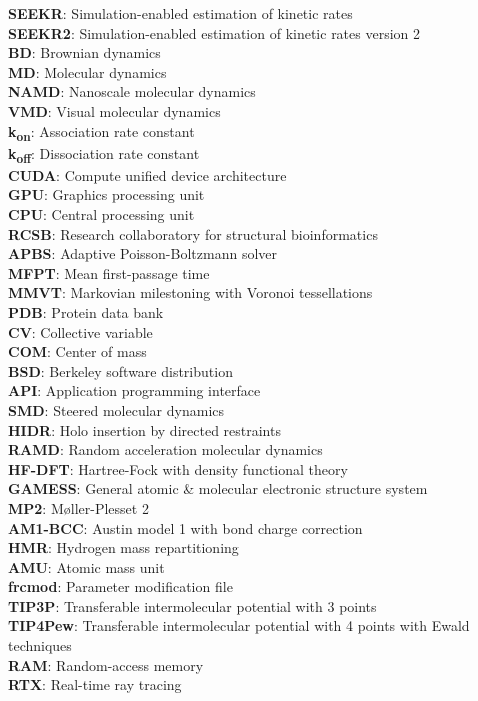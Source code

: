 \documentclass[9pt,training,pubversion]{livecoms}
\begin{document}
\begin{tcolorbox}[colback=black!10!white, colframe=black!50!black, fontlower=\tiny, left=2pt, right=2pt, top=2pt, bottom=2pt]
\small{\textbf{SEEKR}: Simulation-enabled estimation of kinetic rates \\
\textbf{SEEKR2}: Simulation-enabled estimation of kinetic rates version 2 \\
\textbf{BD}: Brownian dynamics \\
\textbf{MD}: Molecular dynamics \\
\textbf{NAMD}: Nanoscale molecular dynamics \\
\textbf{VMD}: Visual molecular dynamics \\
\textbf{k\textsubscript{on}}: Association rate constant \\
\textbf{k\textsubscript{off}}: Dissociation rate constant \\
\textbf{CUDA}: Compute unified device architecture \\
\textbf{GPU}: Graphics processing unit \\
\textbf{CPU}: Central processing unit \\
\textbf{RCSB}: Research collaboratory for structural bioinformatics \\
\textbf{APBS}: Adaptive Poisson-Boltzmann solver \\
\textbf{MFPT}: Mean first-passage time \\
\textbf{MMVT}: Markovian milestoning with Voronoi tessellations \\
\textbf{PDB}: Protein data bank \\
\textbf{CV}: Collective variable \\
\textbf{COM}: Center of mass \\
\textbf{BSD}: Berkeley software distribution \\
\textbf{API}: Application programming interface \\
\textbf{SMD}: Steered molecular dynamics \\
\textbf{HIDR}: Holo insertion by directed restraints \\
\textbf{RAMD}: Random acceleration molecular dynamics \\
\textbf{HF-DFT}: Hartree-Fock with density functional theory \\
\textbf{GAMESS}: General atomic \& molecular electronic structure system \\
\textbf{MP2}: Møller-Plesset 2 \\
\textbf{AM1-BCC}: Austin model 1 with bond charge correction \\
\textbf{HMR}: Hydrogen mass repartitioning \\
\textbf{AMU}: Atomic mass unit \\
\textbf{frcmod}: Parameter modification file \\
\textbf{TIP3P}: Transferable intermolecular potential with 3 points \\
\textbf{TIP4Pew}: Transferable intermolecular potential with 4 points with Ewald techniques \\
\textbf{RAM}: Random-access memory \\
\textbf{RTX}: Real-time ray tracing }
\end{tcolorbox}
\end{document}
